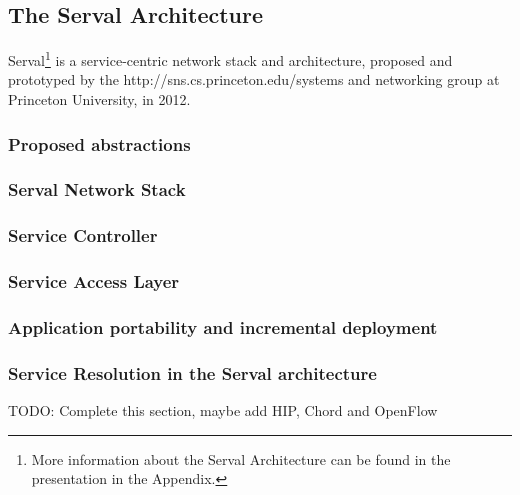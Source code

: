 \subsection{The Serval Architecture}
Serval\footnote{More information about the Serval Architecture can be found in the presentation in the Appendix.} is a service-centric network stack and architecture, proposed and prototyped by the {http://sns.cs.princeton.edu/}{systems and networking group} at Princeton University, in 2012.


\subsubsection{Proposed abstractions}
\subsubsection{Serval Network Stack}
\subsubsection*{Service Controller}
\subsubsection*{Service Access Layer}
\subsubsection{Application portability and incremental deployment}
\subsubsection{Service Resolution in the Serval architecture}

TODO: Complete this section, maybe add HIP, Chord and OpenFlow